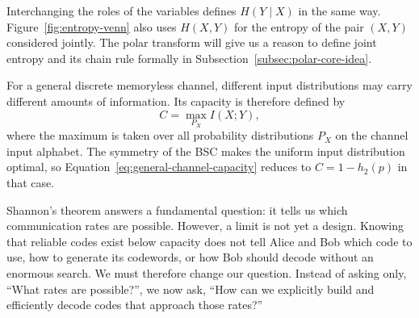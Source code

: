 Interchanging the roles of the variables defines $H(Y\mid X)$ in the same way. Figure~\ref{fig:entropy-venn} also uses $H(X,Y)$ for the entropy of the pair $(X,Y)$ considered jointly. The polar transform will give us a reason to define joint entropy and its chain rule formally in Subsection~\ref{subsec:polar-core-idea}.

For a general discrete memoryless channel, different input distributions may carry different amounts of information. Its capacity is therefore defined by
\begin{equation}
C=\max_{P_X}I(X;Y),
\label{eq:general-channel-capacity}
\end{equation}
where the maximum is taken over all probability distributions $P_X$ on the channel input alphabet. The symmetry of the BSC makes the uniform input distribution optimal, so Equation~\eqref{eq:general-channel-capacity} reduces to $C=1-h_2(p)$ in that case.

Shannon's theorem answers a fundamental question: it tells us which communication rates are possible. However, a limit is not yet a design. Knowing that reliable codes exist below capacity does not tell Alice and Bob which code to use, how to generate its codewords, or how Bob should decode without an enormous search. We must therefore change our question. Instead of asking only, ``What rates are possible?'', we now ask, ``How can we explicitly build and efficiently decode codes that approach those rates?''
